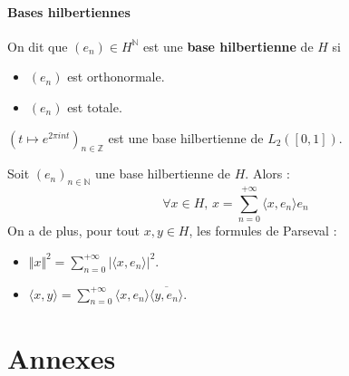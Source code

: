 	\paragraph{Bases hilbertiennes}


	\begin{definition}
		On dit que $(e_n) \in H^{\mathbb{N}}$ est une \textbf{base hilbertienne} de $H$ si
		\begin{itemize}
			\item $(e_n)$ est orthonormale.
			\item $(e_n)$ est totale.
		\end{itemize}
	\end{definition}

	\begin{example}
		$(t \mapsto e^{2\pi int})_{n \in \mathbb{Z}}$ est une base hilbertienne de $L_2([0,1])$.
	\end{example}

	\begin{theorem}
		Soit $(e_n)_{n \in \mathbb{N}}$ une base hilbertienne de $H$. Alors :
		\[ \forall x \in H, \, x = \sum_{n=0}^{+\infty} \langle x, e_n \rangle e_n \]
		On a de plus, pour tout $x, y \in H$, les formules de Parseval :
		\begin{itemize}
			\item $\Vert x \Vert^2 = \sum_{n=0}^{+\infty} \vert \langle x, e_n \rangle \vert^2$.
			\item $\langle x, y \rangle = \sum_{n=0}^{+\infty} \langle x, e_n \rangle \overline{\langle y, e_n \rangle}$.
		\end{itemize}
	\end{theorem}

	\newpage
	\section*{Annexes}


